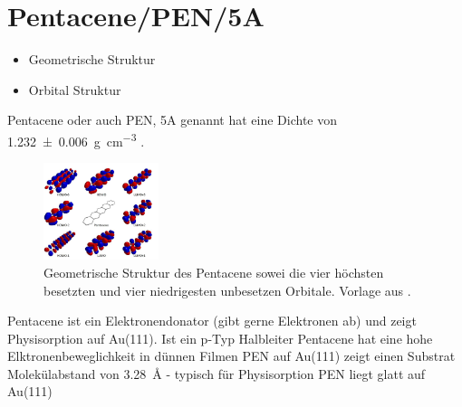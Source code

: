     \section{Pentacene/PEN/5A}
        \begin{itemize}
            \item Geometrische Struktur
            \item Orbital Struktur
        \end{itemize}
        Pentacene oder auch PEN, 5A genannt hat eine Dichte von \SI{1.232(6)}{\gram\per\cubic\centi\meter} \cite{CAS}.
        \begin{figure}
            \centering
            \includegraphics[width=0.3\textwidth]{./content/PEN.jpg}
            \caption{Geometrische Struktur des Pentacene sowei die vier höchsten besetzten und vier niedrigesten unbesetzen Orbitale. Vorlage aus \cite{PEN}.}
            \label{fig:PEN}
        \end{figure}
        
        \textbf{\cite{5A_1}}
        Pentacene ist ein Elektronendonator (gibt gerne Elektronen ab) und zeigt Physisorption auf Au(111).
        Ist ein p-Typ Halbleiter
        Pentacene hat eine hohe Elktronenbeweglichkeit in dünnen Filmen
        PEN auf Au(111) zeigt einen Substrat Molekülabstand von \SI{3.28}{\angstrom} - typisch für Physisorption
        PEN liegt glatt auf Au(111)
    